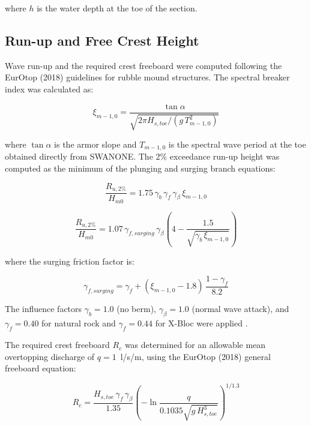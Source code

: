 \documentclass[a4paper, 11pt]{article}
\begin{document}
where $h$ is the water depth at the toe of the section.

\subsection{Run-up and Free Crest Height}
\label{sec:runup}
\hspace{0.5cm}Wave run-up and the required crest freeboard were 
computed following the EurOtop (2018) guidelines for rubble mound 
structures. The spectral breaker index was calculated as:

\begin{equation}
    \xi_{m-1,0} = \frac{\tan\alpha}{\sqrt{2\pi H_{s,toe} / 
    (g\,T_{m-1,0}^2)}}
\end{equation}

where $\tan\alpha$ is the armor slope and $T_{m-1,0}$ is the 
spectral wave period at the toe obtained directly from SWANONE. 
The 2\% exceedance run-up height was computed as the minimum of 
the plunging and surging branch equations:

\begin{equation}
    \frac{R_{u,2\%}}{H_{m0}} = 
    1.75\,\gamma_b\,\gamma_f\,\gamma_\beta\,\xi_{m-1,0}
\end{equation}

\begin{equation}
    \frac{R_{u,2\%}}{H_{m0}} = 
    1.07\,\gamma_{f,surging}\,\gamma_\beta
    \left(4 - \frac{1.5}{\sqrt{\gamma_b\,\xi_{m-1,0}}}\right)
\end{equation}

where the surging friction factor is:

\begin{equation}
    \gamma_{f,surging} = \gamma_f + 
    (\xi_{m-1,0} - 1.8)\,\frac{1 - \gamma_f}{8.2}
\end{equation}

The influence factors $\gamma_b = 1.0$ (no berm), 
$\gamma_\beta = 1.0$ (normal wave attack), and $\gamma_f = 0.40$ 
for natural rock and $\gamma_f = 0.44$ for X-Bloc were applied 
\cite{EurOtop2018}.

The required crest freeboard $R_c$ was determined for an allowable 
mean overtopping discharge of $q = 1$~l/s/m, using the EurOtop 
(2018) general freeboard equation:

\begin{equation}
    R_c = \frac{H_{s,toe}\,\gamma_f\,\gamma_\beta}{1.35}
    \left(-\ln\frac{q}{0.1035\sqrt{g\,H_{s,toe}^3}}\right)^{1/1.3}
\end{equation}
\end{document}
